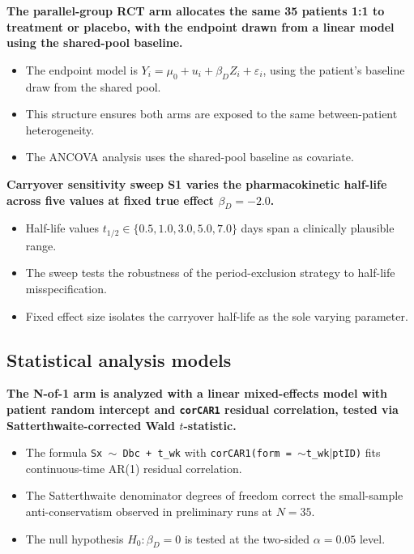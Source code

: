 \documentclass[
  11pt,
]{article}
\begin{document}
\textbf{The parallel-group RCT arm allocates the same 35 patients 1:1 to treatment or placebo, with the endpoint drawn from a linear model using the shared-pool baseline.}

\begin{itemize}\setlength{\itemsep}{2pt}\setlength{\parskip}{0pt}
\item The endpoint model is $Y_i = \mu_0 + u_i + \beta_D Z_i + \varepsilon_i$, using the patient's baseline draw from the shared pool.
\item This structure ensures both arms are exposed to the same between-patient heterogeneity.
\item The ANCOVA analysis uses the shared-pool baseline as covariate.
\end{itemize}

\textbf{Carryover sensitivity sweep S1 varies the pharmacokinetic half-life across five values at fixed true effect $\beta_D = -2.0$.}

\begin{itemize}\setlength{\itemsep}{2pt}\setlength{\parskip}{0pt}
\item Half-life values $t_{1/2} \in \{0.5, 1.0, 3.0, 5.0, 7.0\}$ days span a clinically plausible range.
\item The sweep tests the robustness of the period-exclusion strategy to half-life misspecification.
\item Fixed effect size isolates the carryover half-life as the sole varying parameter.
\end{itemize}

\subsection{Statistical analysis models}\label{statistical-analysis-models}

\textbf{The N-of-1 arm is analyzed with a linear mixed-effects model with patient random intercept and \texttt{corCAR1} residual correlation, tested via Satterthwaite-corrected Wald $t$-statistic.}

\begin{itemize}\setlength{\itemsep}{2pt}\setlength{\parskip}{0pt}
\item The formula \texttt{Sx $\sim$ Dbc + t\_wk} with \texttt{corCAR1(form = $\sim$t\_wk$|$ptID)} fits continuous-time AR(1) residual correlation.
\item The Satterthwaite denominator degrees of freedom correct the small-sample anti-conservatism observed in preliminary runs at $N = 35$.
\item The null hypothesis $H_0: \beta_D = 0$ is tested at the two-sided $\alpha = 0.05$ level.
\end{itemize}
\end{document}
